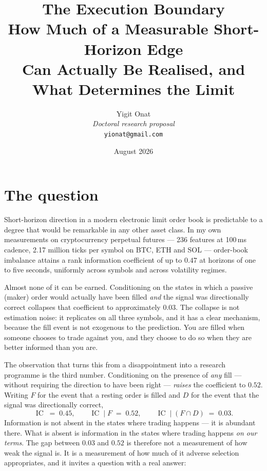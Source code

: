 \documentclass[11pt,a4paper]{article}
\DeclareMathOperator{\IC}{IC}
\begin{document}
\title{\textbf{The Execution Boundary}\\[6pt]
\large How Much of a Measurable Short-Horizon Edge\\
Can Actually Be Realised, and What Determines the Limit}

\author{Yigit Onat\\
\textit{Doctoral research proposal}\\
\texttt{yionat@gmail.com}}
\date{August 2026}
\maketitle

\section{The question}

Short-horizon direction in a modern electronic limit order book is predictable to a degree that
would be remarkable in any other asset class. In my own measurements on cryptocurrency perpetual
futures --- 236 features at 100\,ms cadence, 2.17 million ticks per symbol on BTC, ETH and SOL ---
order-book imbalance attains a rank information coefficient of up to $0.47$ at horizons of one to
five seconds, uniformly across symbols and across volatility regimes.

Almost none of it can be earned. Conditioning on the states in which a passive (maker) order would
actually have been filled \emph{and} the signal was directionally correct collapses that coefficient
to approximately $0.03$. The collapse is not estimation noise: it replicates on all three symbols,
and it has a clear mechanism, because the fill event is not exogenous to the prediction. You are
filled when someone chooses to trade against you, and they choose to do so when they are better
informed than you are.

The observation that turns this from a disappointment into a research programme is the third
number. Conditioning on the presence of \emph{any} fill --- without requiring the direction to have
been right --- \emph{raises} the coefficient to $0.52$. Writing $F$ for the event that a resting
order is filled and $D$ for the event that the signal was directionally correct,
\begin{equation}
  \IC \;=\; 0.45,
  \qquad
  \IC \mid F \;=\; 0.52,
  \qquad
  \IC \mid (F \cap D) \;=\; 0.03 .
  \label{eq:three}
\end{equation}
Information is not absent in the states where trading happens --- it is abundant there. What is
absent is information in the states where trading happens \emph{on our terms}. The gap between
$0.03$ and $0.52$ is therefore not a measurement of how weak the signal is. It is a measurement of
how much of it adverse selection appropriates, and it invites a question with a real answer:
\end{document}
